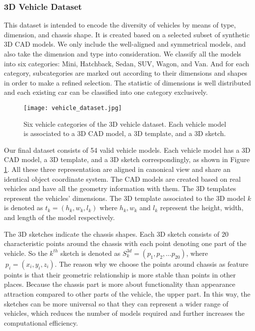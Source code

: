 \subsubsection{3D Vehicle Dataset}
This dataset is intended to encode the diversity of vehicles by means of type, dimension, and chassis shape. It is created based on a selected subset of synthetic 3D CAD models\cite{NIPS2012_4562}. We only include the well-aligned and  symmetrical models, and also take the dimension and type into consideration. We classify all the models into six categories: Mini, Hatchback, Sedan, SUV, Wagon, and Van. And for each category,  subcategories are marked out according to their dimensions and shapes in order to make a refined selection.  The statistic of dimensions is well distributed and each existing car can be classified into one category exclusively.

\begin{figure}[h]		
	\texttt{[image: vehicle\_dataset.jpg]}
	\caption{Six vehicle categories of the 3D vehicle dataset. Each vehicle model is associated to a 3D CAD model, a 3D template, and a 3D sketch.}
	\centering
	\label{figure:vehicle_dataset}
\end{figure}

Our final dataset consists of 54 valid vehicle models. Each vehicle model has a 3D CAD model, a 3D template, and a 3D sketch correspondingly, as shown in Figure \ref{figure:vehicle_dataset}. All these three representation are aligned in canonical view and share an identical object coordinate system. The CAD models are created based on real vehicles and have all the geometry information with them. The 3D templates represent the vehicles' dimensions. The 3D template associated to the 3D model $k$ is denoted as $t_k = (h_k, w_k, l_k)$ where $h_k, w_k$ and $l_k$ represent the height, width, and length of the model respectively. 

The  3D sketches indicate the chassis shapes. Each 3D sketch consists of 20 characteristic points around the chassis with each point denoting one part of the vehicle. So the $k^{th}$ sketch is denoted as $S_k^{3d}  = (p_1, p_2, ... p_{20})$, where $~p_i = (x_i, y_i, z_i)$. The reason why we choose the points around chassis as feature points is that their geometric relationship is more stable than points in other places. Because the chassis part is more about functionality than appearance attraction compared to other parts of the vehicle,  \eg the upper part. In this way, the sketches can be more universal so that they can represent a wider range of vehicles, which reduces the number of models required and further increases the computational efficiency. 

